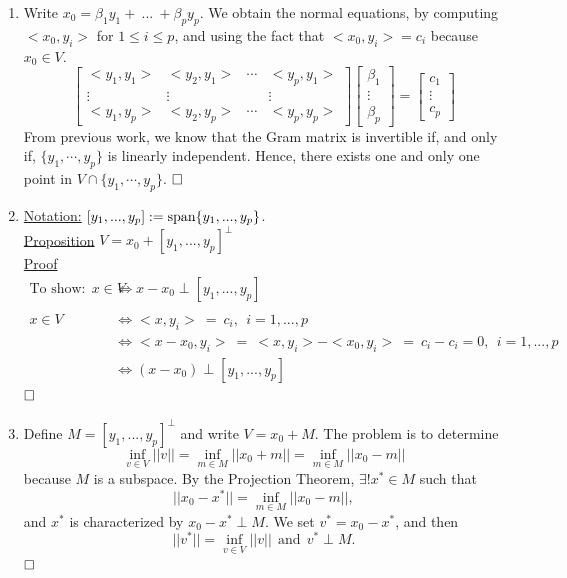 \documentclass[letterpaper]{article}
\begin{document}
\begin{enumerate}
\begin{enumerate}
\setlength{\itemsep}{.1in}
\renewcommand{\labelenumi}{(\alph{enumi})}
\item Write $x_0 = \beta_1 y_1+~...~ +\beta_p y_p$. We obtain the normal equations, by computing $<x_0, y_i>$ for $1 \le i \le p$, and using the fact that $<x_0,y_i>=c_i$ because $x_0 \in V$.
    $$\left[ \begin{array}{cccc}
<y_1, y_1> & <y_2, y_1> & \cdots & <y_p, y_1> \\
\vdots & \vdots& & \vdots\\
<y_1, y_p> & <y_2, y_p> & \cdots & <y_p, y_p>
\end{array} \right] \begin{bmatrix} \beta_1 \\ \vdots \\ \beta_p \end{bmatrix} = \begin{bmatrix} c_1\\ \vdots \\c_p \end{bmatrix}$$
From previous work, we know that the Gram matrix is invertible if, and only if, $\{y_1, \cdots, y_p  \}$ is linearly independent. Hence, there exists one and only one point in $V\cap \{y_1, \cdots, y_p  \}$. $\hfill \square$

\newpage

\item \underline{Notation:} $[y_1, ..., y_p] := \textrm{span} \{ y_1,...,y_p \}$.\\

\underline{Proposition} $V = x_0 + [y_1, ..., y_p]^\perp$\\

\underline{Proof}
$$\begin{aligned}  \text{To show:} ~~ x\in V &\iff x-x_0 \perp [y_1, ..., y_p] \\
\\
x\in V &\iff <x, y_i>~ =~ c_i, ~~ i = 1, ..., p \\
&\iff <x-x_0, y_i>~ = ~<x, y_i> - <x_0, y_i> ~= ~c_i - c_i = 0, ~~ i = 1,...,p\\
&\iff (x-x_0) \perp [y_1, ..., y_p] \end{aligned} $$
$\hfill \square$

\item Define $M = [y_1, ..., y_p]^\perp$ and write $V=x_0+M$. The problem is to determine
$$\inf_{v\in V} ||v|| = \inf_{m\in M} ||x_0 + m|| = \inf_{m\in M} ||x_0 - m||$$
because $M$ is a subspace. By the Projection Theorem, $\exists ! x^* \in M$ such that
$$||x_0 - x^*|| = \inf_{m\in M} ||x_0 - m||,$$
and $x^*$ is characterized by $x_0 - x^* \perp M$. We set $v^* = x_0 - x^*$, and then\\
$$||v^*|| = \inf_{v\in V} ||v||~~ \text{and} ~~v^* \perp M.$$ $\hfill \square$\\


\end{enumerate}
\end{enumerate}
\end{document}
